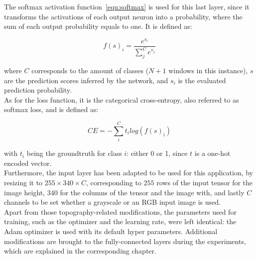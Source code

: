 The softmax activation function~\ref{equ:softmax} is used for this last layer,
since it transforms the activations of each output neuron into a probability,
where the sum of each output probability equals to one. It is defined as:

\begin{equation}
	\label{equ:softmax}
	f(s)_i=\frac{e^{s_i}}{\sum_j^C e^{s_j}}
\end{equation}

where $C$ corresponds to the amount of classes ($N+1$ windows in this
instance), $s$ are the prediction scores inferred by the network, and $s_i$ is
the evaluated prediction probability.\\

As for the loss function, it is the categorical cross-entropy, also referred to
as softmax loss, and is defined as:

\begin{equation}
	\label{equ:catcrossentr}
	CE=\displaystyle-\sum_i^C t_i log(f(s)_i)
\end{equation}

with $t_i$ being the groundtruth for class $i$: either 0 or 1, since $t$ is a
one-hot encoded vector.\\


Furthermore, the input layer has been adapted to be used for this application,
by resizing it to $255\times340\times C$, corresponding to $255$ rows of the
input tensor for the image height, $340$ for the columns of the tensor and the
image with, and lastly $C$ channels to be set whether a grayscale or an RGB
input image is used.\\

Apart from those topography-related modifications, the parameters used for
training, such as the optimizer and the learning rate, were left identical: the
Adam optimizer is used with its default hyper parameters. Additional
modifications are brought to the fully-connected layers during the experiments,
which are explained in the corresponding chapter.

